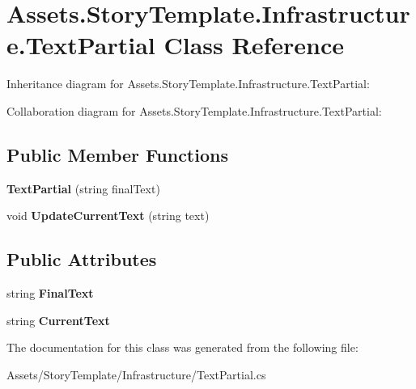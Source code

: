 \hypertarget{classAssets_1_1StoryTemplate_1_1Infrastructure_1_1TextPartial}{}\section{Assets.\+Story\+Template.\+Infrastructure.\+Text\+Partial Class Reference}
\label{classAssets_1_1StoryTemplate_1_1Infrastructure_1_1TextPartial}


Inheritance diagram for Assets.\+Story\+Template.\+Infrastructure.\+Text\+Partial\+:


Collaboration diagram for Assets.\+Story\+Template.\+Infrastructure.\+Text\+Partial\+:
\subsection*{Public Member Functions}
\begin{DoxyCompactItemize}
\item 
{\bfseries Text\+Partial} (string final\+Text)\hypertarget{classAssets_1_1StoryTemplate_1_1Infrastructure_1_1TextPartial_aea1d23a34cc4a4a14d9412afb0ec5616}{}\label{classAssets_1_1StoryTemplate_1_1Infrastructure_1_1TextPartial_aea1d23a34cc4a4a14d9412afb0ec5616}

\item 
void {\bfseries Update\+Current\+Text} (string text)\hypertarget{classAssets_1_1StoryTemplate_1_1Infrastructure_1_1TextPartial_a3982861d52529b09662a01af841fdf3d}{}\label{classAssets_1_1StoryTemplate_1_1Infrastructure_1_1TextPartial_a3982861d52529b09662a01af841fdf3d}

\end{DoxyCompactItemize}
\subsection*{Public Attributes}
\begin{DoxyCompactItemize}
\item 
string {\bfseries Final\+Text}\hypertarget{classAssets_1_1StoryTemplate_1_1Infrastructure_1_1TextPartial_adb4a90df918c6a46c654064441b2cbd0}{}\label{classAssets_1_1StoryTemplate_1_1Infrastructure_1_1TextPartial_adb4a90df918c6a46c654064441b2cbd0}

\item 
string {\bfseries Current\+Text}\hypertarget{classAssets_1_1StoryTemplate_1_1Infrastructure_1_1TextPartial_a5ea3aa9d67ce7d82fd45f3a1b0f62223}{}\label{classAssets_1_1StoryTemplate_1_1Infrastructure_1_1TextPartial_a5ea3aa9d67ce7d82fd45f3a1b0f62223}

\end{DoxyCompactItemize}


The documentation for this class was generated from the following file\+:\begin{DoxyCompactItemize}
\item 
Assets/\+Story\+Template/\+Infrastructure/Text\+Partial.\+cs\end{DoxyCompactItemize}
